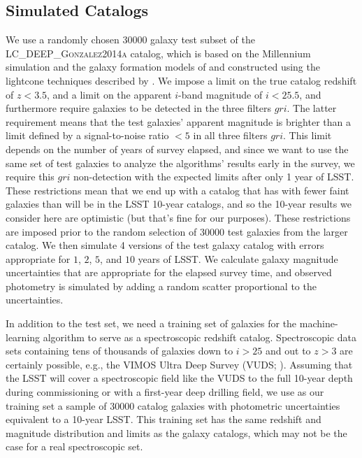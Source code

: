 \documentclass[DM,lsstdraft,toc]{lsstdoc}
\begin{document}
\subsection{Simulated Catalogs}\label{ssec:cats}

We use a randomly chosen 30000 galaxy test subset of the \textsc{LC\_DEEP\_Gonzalez2014a} catalog, which is based on the Millennium simulation \citep{2005Natur.435..629S} and the galaxy formation models of \cite{2014MNRAS.439..264G} and constructed using the lightcone techniques described by \cite{2013MNRAS.429..556M}. We impose a limit on the true catalog redshift of $z<3.5$, and a limit on the apparent $i$-band magnitude of $i<25.5$, and furthermore require galaxies to be detected in the three filters $gri$. The latter requirement means that the test galaxies' apparent magnitude is brighter than a limit defined by a signal-to-noise ratio $<5$ in all three filters $gri$. This limit depends on the number of years of survey elapsed, and since we want to use the same set of test galaxies to analyze the algorithms' results early in the survey, we require this $gri$ non-detection with the expected limits after only 1 year of LSST. These restrictions mean that we end up with a catalog that has with fewer faint galaxies than will be in the LSST 10-year catalogs, and so the 10-year results we consider here are optimistic (but that's fine for our purposes). These restrictions are imposed prior to the random selection of 30000 test galaxies from the larger catalog. We then simulate 4 versions of the test galaxy catalog with errors appropriate for $1$, $2$, $5$, and $10$ years of LSST. We calculate galaxy magnitude uncertainties that are appropriate for the elapsed survey time, and observed photometry is simulated by adding a random scatter proportional to the uncertainties.

In addition to the test set, we need a training set of galaxies for the machine-learning algorithm to serve as a spectroscopic redshift catalog. Spectroscopic data sets containing tens of thousands of galaxies down to $i>25$ and out to $z>3$ are certainly possible, e.g., the VIMOS Ultra Deep Survey (VUDS; \citealt{2015A&A...576A..79L}). Assuming that the LSST will cover a spectroscopic field like the VUDS to the full 10-year depth during commissioning or with a first-year deep drilling field, we use as our training set a sample of 30000 catalog galaxies with photometric uncertainties equivalent to a 10-year LSST. This training set has the same redshift and magnitude distribution and limits as the galaxy catalogs, which may not be the case for a real spectroscopic set.
\end{document}

